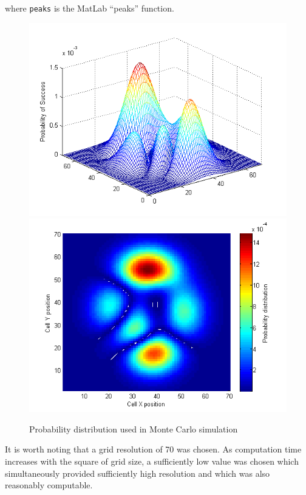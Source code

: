 \documentclass[a4paper]{article}
\begin{document}
where \texttt{peaks} is the MatLab ``peaks'' function.

\begin{figure}[H]\begin{center}
\includegraphics[scale=0.5]{../Matlab/Images/InitialProbDist.png}
\includegraphics[scale=0.5]{../Matlab/Images/InitialProbDistSurf.png}
\caption{Probability distribution used in Monte Carlo simulation}
\end{center}\end{figure}

It is worth noting that a grid resolution of 70 was chosen. As computation time increases with the square of grid size, a sufficiently low value was chosen which simultaneously provided sufficiently high resolution and which was also reasonably computable. 
\end{document}

